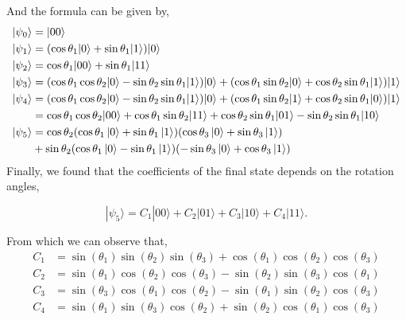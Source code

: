 \documentclass[11p]{article}
\begin{document}
And the formula can be given by,
\begin{align*}
|\psi_0\rangle &= |00 \rangle \\
|\psi_1\rangle &= (\cos\theta_1|0\rangle + \sin\theta_1|1\rangle)|0\rangle\\
|\psi_2\rangle & = \cos\theta_1|00\rangle + \sin\theta_1|11\rangle\\
|\psi_3\rangle &=(\cos\theta_1\cos\theta_2|0\rangle - \sin\theta_2\sin\theta_1|1\rangle)|0\rangle + (\cos\theta_1\sin\theta_2|0\rangle + \cos\theta_2\sin\theta_1|1\rangle)|1\rangle\\
|\psi_4\rangle &=(\cos\theta_1\cos\theta_2|0\rangle - \sin\theta_2\sin\theta_1|1\rangle)|0\rangle + (\cos\theta_1\sin\theta_2|1\rangle + \cos\theta_2\sin\theta_1|0\rangle)|1\rangle\\
&=\cos\theta_1\cos\theta_2|00\rangle + \cos\theta_1\sin\theta_2|11\rangle + \cos\theta_2\sin\theta_1|01\rangle- \sin\theta_2\sin\theta_1|10\rangle\\
|\psi_5\rangle&=\cos\theta_2(\cos\theta_1\ket{0}+\sin\theta_1\ket{1})(\cos\theta_3\ket{0}+\sin\theta_3\ket{1})\\
&+\sin\theta_2(\cos\theta_1\ket{0}-\sin\theta_1\ket{1})(-\sin\theta_3\ket{0}+\cos\theta_3\ket{1})\\
\end{align*}
Finally, we found that the coefficients of the final state depends on the rotation angles,

\[
    |\psi_5\rangle= C_1|00\rangle + C_2|01\rangle + C_3|10\rangle +C_4 |11\rangle.
\]

From which we can observe that,
\[
    \begin{aligned}
    C_1 &=     \sin(\theta_1)  \sin(\theta_2)  \sin(\theta_3) +  \cos(\theta_1)  \cos(\theta_2)  \cos(\theta_3)\\
    C_2 &=   \sin(\theta_1)  \cos(\theta_2)  \cos(\theta_3) -   \sin(\theta_2)  \sin(\theta_3)  \cos(\theta_1) \\
    C_3 &=   \sin(\theta_3)  \cos(\theta_1)  \cos(\theta_2) -  \sin(\theta_1)  \sin(\theta_2)  \cos(\theta_3)\\
    C_4 &=   \sin(\theta_1)  \sin(\theta_3)  \cos(\theta_2) +   \sin(\theta_2)  \cos(\theta_1)  \cos(\theta_3)
    \end{aligned}
\]
\end{document}
